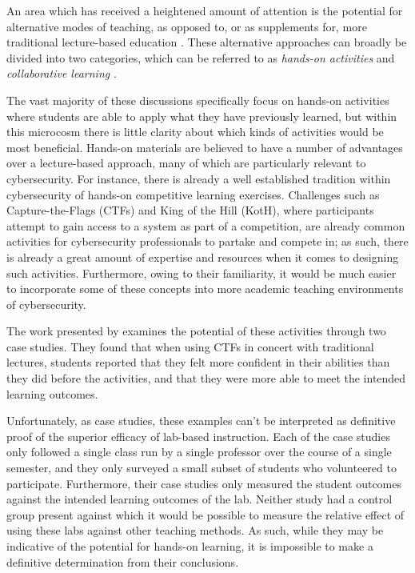     An area which has received a heightened amount of attention is the potential for alternative modes of teaching, as opposed to, or as supplements for, more traditional lecture-based education \cite{Z-Zeng,N-Eliot,E-Gavas,C-Herr,K-Chung, C-Kussmaul,K-Leune,B-Payne,L-Thomas}. %
These alternative approaches can broadly be divided into two categories, which can be referred to as \emph{hands-on activities} and \emph{collaborative learning} \cite{P-Deshpande,C-Kussmaul,B-Payne}.



    The vast majority of these discussions specifically focus on hands-on activities where students are able to apply what they have previously learned, but within this microcosm there is little clarity about which kinds of activities would be most beneficial. Hands-on materials are believed to have a number of advantages over a lecture-based approach, many of which are particularly relevant to cybersecurity. %
For instance, there is already a well established tradition within cybersecurity of hands-on competitive learning exercises. %
Challenges such as Capture-the-Flags (CTFs) and King of the Hill (KotH), where participants attempt to gain access to a system as part of a competition, are already common activities for cybersecurity professionals to partake and compete in; %
as such, there is already a great amount of expertise and resources when it comes to designing such activities. %
Furthermore, owing to their familiarity, it would be much easier to incorporate some of these concepts into more academic teaching environments of cybersecurity.

    The work presented by \textcite{K-Leune} examines the potential of these activities through two case studies. %
They found that when using CTFs in concert with traditional lectures, students reported that they felt more confident in their abilities than they did before the activities, and that they were more able to meet the intended learning outcomes. 

    Unfortunately, as case studies, these examples can't be interpreted as definitive proof of the superior efficacy of lab-based instruction. %
Each of the case studies only followed a single class run by a single professor over the course of a single semester, and they only surveyed a small subset of students who volunteered to participate. %
Furthermore, their case studies only measured the student outcomes against the intended learning outcomes of the lab. %
Neither study had a control group present against which it would be possible to measure the relative effect of using these labs against other teaching methods. %
As such, while they may be indicative of the potential for hands-on learning, it is impossible to make a definitive determination from their conclusions.

